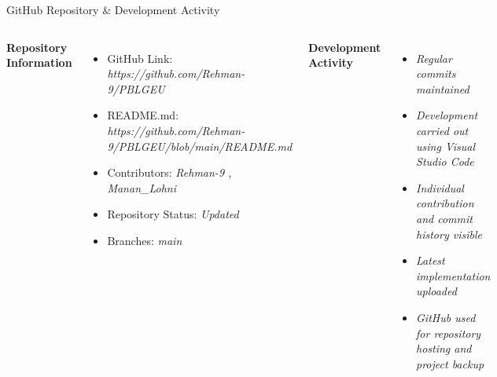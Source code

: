 \documentclass[aspectratio=169,11pt]{beamer}
\newcommand{\placeholder}[1]{%
\textit{\color{GEUGrey}#1}
}
\begin{document}
\begin{frame}{GitHub Repository \& Development Activity}
\vspace{-0.7cm}
\begin{columns}[T,totalwidth=\textwidth]

\textbf{\color{GEUBlue}Repository Information}

\begin{itemize}\itemsep3pt
\item GitHub Link: \placeholder{https://github.com/Rehman-9/PBLGEU}
\item README.md: \placeholder{https://github.com/Rehman-9/PBLGEU/blob/main/README.md}
\item Contributors: \placeholder{Rehman-9 , Manan_Lohni}
\item Repository Status: \placeholder{Updated}
\item Branches: \placeholder{main}
\end{itemize}


\textbf{\color{GEUBlue}Development Activity}

\begin{itemize}\itemsep3pt
\item \placeholder{Regular commits maintained}
\item \placeholder{Development carried out using Visual Studio Code}
\item \placeholder{Individual contribution and commit history visible}
\item \placeholder{Latest implementation uploaded}
\item \placeholder{GitHub used for repository hosting and project backup}
\end{itemize}

\end{columns}

\vfill





\end{frame}
\end{document}
